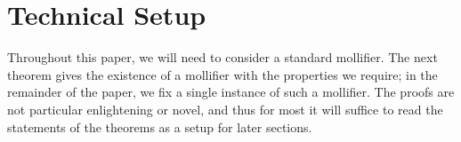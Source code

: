 \documentclass[12pt,reqno]{article}
\numberwithin{equation}{section}
\newtheorem*{remark}{Remark}
\DeclareMathOperator{\EE}{\mathbf{E}}
\newcommand{\psitwo}[1]{\| {#1} \|_{\psi_2(L)}}
\begin{document}
\begin{itemize}
\begin{comment}
    
    
        \item If $X_1, \dots, X_N$ are \emph{independent}, then
        \[ \psitwo{X_1 + \dots + X_N} \leq 10 \left( \psitwo{X_1}^2 + \dots + \psitwo{X_N}^2 \right)^{1/2}. \]
        This is an equivalent way to state \emph{Hoeffding's Inequality}, and we refer to an application of this inequality as an application of Hoeffding's inequality.
    \end{itemize}
    Roughly speaking, if $X$ is a random variable with $\psitwo{X} \leq A$, we can think of $X$ as being sharply concentrated in the region $[-A,A]$. The Orlicz norm thus provides a convenient way to quantify concentration phenomena.
    \begin{remark}
        The constants involved in these statements are suboptimal, but will suffice for our purposes. Proofs can be found in Chapter 2 of \cite{Vershynin}.
    \end{remark}

    \end{comment}
\end{itemize}

\section{Technical Setup}

Throughout this paper, we will need to consider a standard mollifier. The next theorem gives the existence of a mollifier with the properties we require; in the remainder of the paper, we fix a single instance of such a mollifier. The proofs are not particular enlightening or novel, and thus for most it will suffice to read the statements of the theorems as a setup for later sections.
\end{document}
